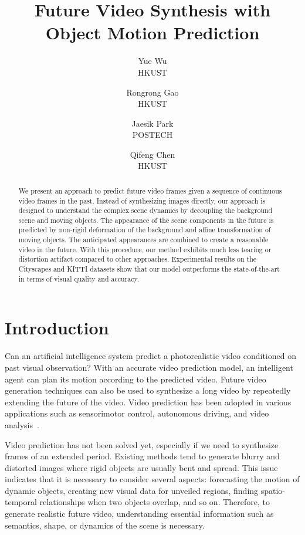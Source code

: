 \documentclass[10pt,twocolumn,letterpaper]{article}
\begin{document}
\title{Future Video Synthesis with Object Motion Prediction}

\author{Yue Wu\\
HKUST
\and
Rongrong Gao\\
HKUST
\and
Jaesik Park\\
POSTECH
\and
Qifeng Chen\\
HKUST
}

\maketitle

\begin{abstract}
We present an approach to predict future video frames given a sequence of continuous video frames in the past. Instead of synthesizing images directly, our approach is designed to understand the complex scene dynamics by decoupling the background scene and moving objects. The appearance of the scene components in the future is predicted by non-rigid deformation of the background and affine transformation of moving objects. The anticipated appearances are combined to create a  reasonable video in the future. With this procedure, our method exhibits much less tearing or distortion artifact compared to other approaches. Experimental results on the Cityscapes and KITTI datasets show that our model outperforms the state-of-the-art in terms of visual quality and accuracy.
\end{abstract}


\section{Introduction}
Can an artificial intelligence system predict a photorealistic video conditioned on past visual observation? With an accurate video prediction model, an intelligent agent can plan its motion according to the predicted video. Future video generation techniques can also be used to synthesize a long video by repeatedly extending the future of the video. Video prediction has been adopted in various applications such as sensorimotor control, autonomous driving, and video analysis~\cite{Finn2016,Srivastava2015,NextSegmPredICCV17,highfideity}.  

Video prediction has not been solved yet, especially if we need to synthesize frames of an extended period. Existing methods tend to generate blurry and distorted images where rigid objects are usually bent and spread. This issue indicates that it is necessary to consider several aspects: forecasting the motion of dynamic objects, creating new visual data for unveiled regions, finding spatio-temporal relationships when two objects overlap, and so on. Therefore, to generate realistic future video, understanding essential information such as semantics, shape, or dynamics of the scene is necessary. 
\end{document}
